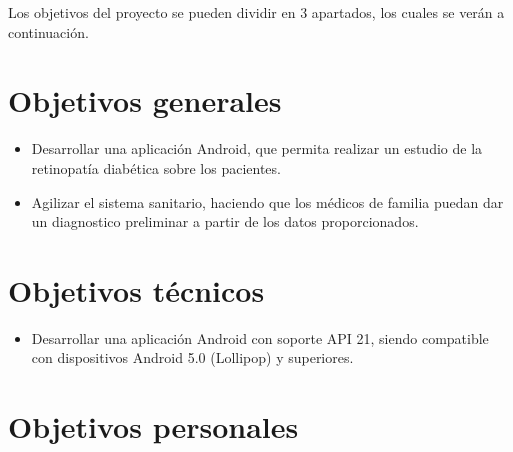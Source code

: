 
Los objetivos del proyecto se pueden dividir en 3 apartados, los cuales se verán a continuación. 
\section{Objetivos generales}
\begin{itemize}
    \item Desarrollar una aplicación Android, que permita realizar un estudio de la retinopatía diabética sobre los pacientes.
    \item Agilizar el sistema sanitario, haciendo que los médicos de familia puedan dar un diagnostico preliminar a partir de los datos proporcionados.

\end{itemize}
\section{Objetivos técnicos}
\begin{itemize}
    \item Desarrollar una aplicación Android con soporte API 21, siendo compatible con dispositivos Android 5.0 (Lollipop) y superiores.
    
    
\end{itemize}
\section{Objetivos personales}